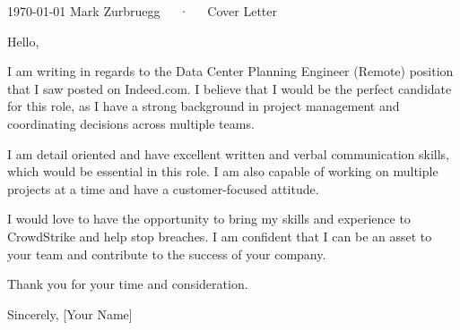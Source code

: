 \documentclass[11pt, a4paper]{awesome-cv}
\begin{document}
\makecvheader[R]

\makecvfooter
  {\today}
  {Mark Zurbruegg~~~·~~~Cover Letter}
  {}

\makelettertitle

\begin{cvletter}



Hello,

I am writing in regards to the Data Center Planning Engineer (Remote) position that I saw posted on Indeed.com. I believe that I would be the perfect candidate for this role, as I have a strong background in project management and coordinating decisions across multiple teams.

I am detail oriented and have excellent written and verbal communication skills, which would be essential in this role. I am also capable of working on multiple projects at a time and have a customer-focused attitude.

I would love to have the opportunity to bring my skills and experience to CrowdStrike and help stop breaches. I am confident that I can be an asset to your team and contribute to the success of your company.

Thank you for your time and consideration.

Sincerely,
[Your Name]
\end{cvletter}


\makeletterclosing
\end{document}
